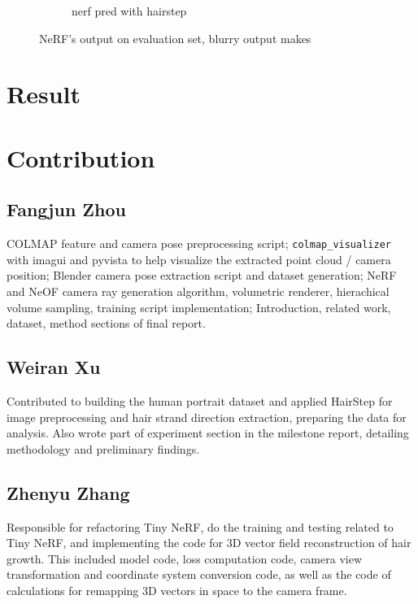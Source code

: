 \documentclass[12pt]{article}
\begin{document}
\begin{figure}[h]
\begin{subfigure}{0.48\textwidth}
\begin{subfigure}{0.48\textwidth}
        \end{subfigure}
        \caption{nerf pred with hairstep}
    \end{subfigure}

    \caption{NeRF's output on evaluation set, blurry output makes }
    \label{fig:nerf_hairstep}
\end{figure}

\section{Result}


\newpage

\printbibliography

\newpage

\section{Contribution}

\subsection{Fangjun Zhou}

COLMAP feature and camera pose preprocessing script; \texttt{colmap\_visualizer} with imagui and pyvista to help visualize the extracted point cloud / camera position; Blender camera pose extraction script and dataset generation; NeRF and NeOF camera ray generation algorithm, volumetric renderer, hierachical volume sampling, training script implementation; Introduction, related work, dataset, method sections of final report.

\subsection{Weiran Xu}

Contributed to building the human portrait dataset and applied HairStep for image preprocessing and hair strand direction extraction, preparing the data for analysis. Also wrote part of experiment section in the milestone report, detailing methodology and preliminary findings.

\subsection{Zhenyu Zhang}

Responsible for refactoring Tiny NeRF, do the training and testing related to Tiny NeRF, and implementing the code for 3D vector field reconstruction of hair growth. This included model code, loss computation code, camera view transformation and coordinate system conversion code, as well as the code of calculations for remapping 3D vectors in space to the camera frame.
\end{document}
